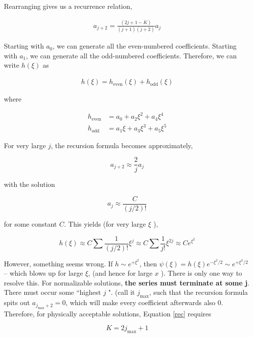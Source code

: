 Rearranging gives us a recurrence relation, 

\begin{align} \label{rec}
  a_{j+2} = \frac{(2j+1-K)}{(j+1)(j+2)}a_j
\end{align}\vspace{3px}

Starting with $a_0$, we can generate all the even-numbered coefficients.
Starting with $a_1$, we can generate all the odd-numbered coefficients.
Therefore, we can write $h(\xi)$ as 

\begin{align} \label{}
  h(\xi) = h_\text{even} (\xi) + h_\text{odd} (\xi)
\end{align}\vspace{3px}

where 

\begin{align} \label{}
  h_\text{even} &= a_0 + a_2\xi^2 + a_4\xi^4 \\ 
  h_\text{odd} &= a_1\xi + a_3\xi^3 + a_5\xi^5
\end{align}\vspace{3px}

For very large $j$, the recursion formula becomes approximately, 

\[
  a_{j+2} \approx \frac{2}{j}a_j
\] \vspace{3px}

with the solution 

\[
a_j \approx \frac{C}{(j/2)!}
\] \vspace{3px}

for some constant  $C$. This yields (for very large $\xi$ ), 

\[
  h(\xi) \approx C\sum \frac{1}{(j/2)!}\xi^j \approx C\sum \frac{1}{j!}\xi^{2j}
  \approx Ce^{\xi^2}
\] \vspace{3px}

However, something seems wrong. If $h \sim e^{+\xi^2}$, then $\psi(\xi)
= h(\xi)e^{-\xi^2/2} \sim e^{+\xi^2/2}$ -- which blows up for large $\xi$, (and
hence for large $x$ ). There is only one way to resolve this. For normalizable
solutions, \textbf{the series must terminate at some j}. There must occur some
``highest $j$ ". (call it $j_\text{max} $, such that the recursion formula
spits out $a_{j_\text{max}  + 2} = 0$, which will make every coefficient
afterwards also 0. Therefore, for physically acceptable solutions, Equation
\ref{rec} requires 

\[
K = 2j_\text{max} + 1
\] \vspace{3px}

